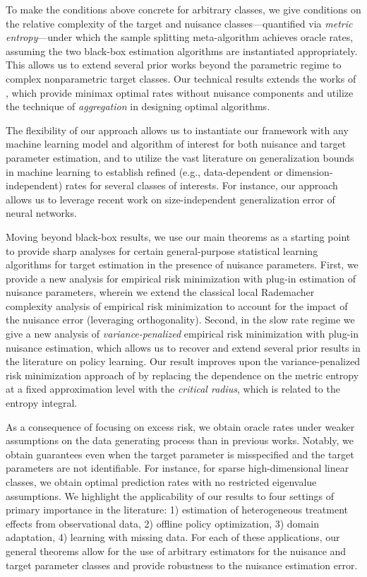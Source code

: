 \documentclass[11pt]{article} %
\theoremstyle{theorem}  %
\theoremstyle{plain}
\newcommand{\param}{parameter\xspace}
\begin{document}
To make the conditions above concrete for arbitrary classes, we give conditions on the relative complexity of the target and nuisance classes---quantified via \emph{metric entropy}---under which the sample splitting meta-algorithm achieves oracle rates, assuming the two black-box estimation algorithms are instantiated appropriately. This allows us to extend several prior works beyond the parametric regime to complex nonparametric target classes. Our technical results extends the works of \cite{yang1999information,rakhlin2017empirical}, which provide minimax optimal rates without nuisance components and utilize the technique of \emph{aggregation} in designing optimal algorithms.

The flexibility of our approach allows us to instantiate our framework with any machine learning model and algorithm of interest for both nuisance and target \param estimation, and to utilize the vast literature on generalization bounds in machine learning to establish refined (e.g., data-dependent or dimension-independent) rates for several classes of interests. For instance, our approach allows us to leverage recent work on size-independent generalization error of neural networks. 

%

Moving beyond black-box results, we use our main theorems as a starting point to provide sharp analyses for certain general-purpose statistical learning algorithms for target estimation in the presence of nuisance parameters. First, we provide a new analysis for empirical risk minimization with plug-in estimation of nuisance parameters, wherein we extend the classical local Rademacher complexity analysis of empirical risk minimization \citep{koltchinskii2000rademacher,bartlett2005local} to account for the impact of the nuisance error (leveraging orthogonality). Second, in the slow rate regime we give a new analysis of \emph{variance-penalized} empirical risk minimization with plug-in nuisance estimation, which allows us to recover and extend several prior results in the literature on policy learning. Our result improves upon the variance-penalized risk minimization approach of \cite{maurer2009empirical} by replacing the dependence on the metric entropy at a fixed approximation level with the \emph{critical radius}, which is related to the entropy integral.

As a consequence of focusing on excess risk, we obtain oracle rates under weaker assumptions on the data generating process than in previous works. Notably, we obtain guarantees even when the target \param is misspecified and the target parameters are not identifiable. For instance, for sparse high-dimensional linear classes, we obtain optimal prediction rates with no restricted eigenvalue assumptions. We highlight the applicability of our results to four settings of primary importance in the literature: 1) estimation of heterogeneous treatment effects from observational data, 2) offline policy optimization, 3) domain adaptation, 4) learning with missing data. For each of these applications, our general theorems allow for the use of arbitrary estimators for the nuisance and target \param classes and provide robustness to the nuisance estimation error. 
\end{document}
